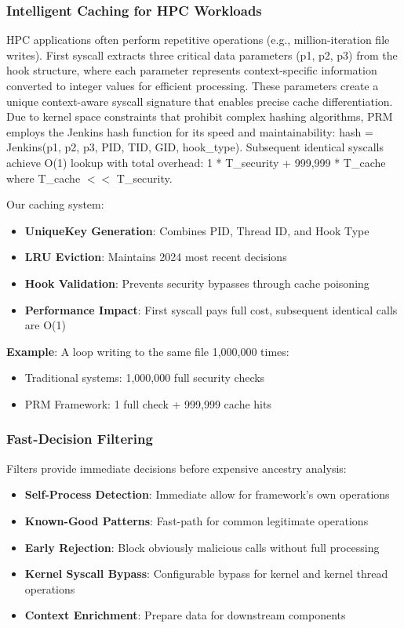 \documentclass[conference]{IEEEtran}
\begin{document}
\subsubsection{Intelligent Caching for HPC Workloads}
HPC applications often perform repetitive operations (e.g., million-iteration file writes). First syscall extracts three critical data parameters (p1, p2, p3) from the hook structure, where each parameter represents context-specific information converted to integer values for efficient processing. These parameters create a unique context-aware syscall signature that enables precise cache differentiation. Due to kernel space constraints that prohibit complex hashing algorithms, PRM employs the Jenkins hash function for its speed and maintainability: hash = Jenkins(p1, p2, p3, PID, TID, GID, hook\_type). Subsequent identical syscalls achieve O(1) lookup with total overhead: 1 * T\_security + 999,999 * T\_cache where T\_cache $<<$ T\_security.

Our caching system:

\begin{itemize}
\item \textbf{UniqueKey Generation}: Combines PID, Thread ID, and Hook Type
\item \textbf{LRU Eviction}: Maintains 2024 most recent decisions
\item \textbf{Hook Validation}: Prevents security bypasses through cache poisoning
\item \textbf{Performance Impact}: First syscall pays full cost, subsequent identical calls are O(1)
\end{itemize}

\textbf{Example}: A loop writing to the same file 1,000,000 times:
\begin{itemize}
\item Traditional systems: 1,000,000 full security checks
\item PRM Framework: 1 full check + 999,999 cache hits
\end{itemize}

\subsubsection{Fast-Decision Filtering}
Filters provide immediate decisions before expensive ancestry analysis:

\begin{itemize}
\item \textbf{Self-Process Detection}: Immediate allow for framework's own operations
\item \textbf{Known-Good Patterns}: Fast-path for common legitimate operations
\item \textbf{Early Rejection}: Block obviously malicious calls without full processing
\item \textbf{Kernel Syscall Bypass}: Configurable bypass for kernel and kernel thread operations
\item \textbf{Context Enrichment}: Prepare data for downstream components
\end{itemize}
\end{document}
